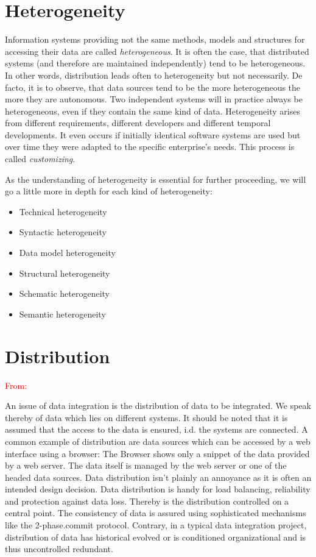 \section{Heterogeneity}
Information systems providing not the same methods, models and structures for accessing their data are called \textit{heterogeneous}. It is often the case, that distributed systems (and therefore are maintained independently) tend to be heterogeneous. In other words, distribution leads often to heterogeneity but not necessarily. De facto, it is to observe, that data sources tend to be the more heterogeneous the more they are autonomous. Two independent systems will in practice always  be heterogeneous, even if they contain the same kind of data. Heterogeneity arises from different requirements, different developers and different temporal developments. It even occurs if initially identical software systems are used but over time they were adapted to the specific enterprise's needs. This process is called \textit{customizing}. 

As the understanding of heterogeneity is essential for further proceeding, we will go a little more in depth for each kind of heterogeneity:
\begin{itemize}
\item Technical  heterogeneity
\item Syntactic  heterogeneity
\item Data model heterogeneity
\item Structural  heterogeneity
\item Schematic  heterogeneity
\item Semantic  heterogeneity
\end{itemize}

\section{Distribution}
\textcolor{red}{From: \cite[chapter 3.1 (p.51-54)]{DBLP:books/dp/LeserN2006}}

An issue of data integration is the distribution of data to be integrated. We speak thereby of data which lies on different systems. It should be noted that it is assumed that the access to the data is ensured, i.d. the systems are connected. A common example of distribution are data sources which can be accessed by a web interface using a browser: The Browser shows only a snippet of the data provided by a web server. The data itself is managed by the web server or one of the headed data sources. 
Data distribution isn't plainly an annoyance as it is often an intended design decision. Data distribution is handy for load balancing, reliability and protection against data loss. Thereby is the distribution controlled on a central point. The consistency of data is assured using sophisticated mechanisms like the 2-phase.commit protocol. Contrary, in a typical data integration project, distribution of data has historical evolved or is conditioned organizational and is thus uncontrolled redundant.

